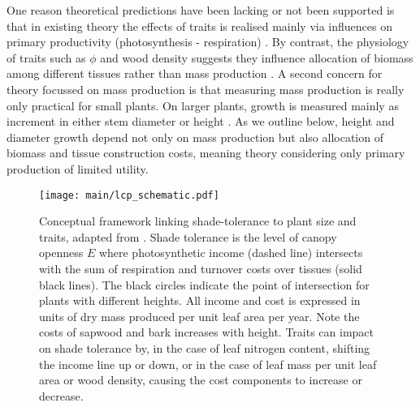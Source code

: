 \documentclass[9pt,twocolumn,twoside,lineno]{pnas-new}
\begin{document}
One reason theoretical predictions have been lacking or not been supported is that in existing theory the effects of traits is realised mainly via influences on primary productivity (photosynthesis - respiration) \citep{Wright-2000, Enquist-2007}. By contrast, the physiology of traits such as $\phi$ and wood density suggests they influence allocation of biomass among different tissues rather than mass production \citep{Falster-2011, Duursma-2016, Gibert-2016}. A second concern for theory focussed on mass production is that measuring mass production is really only practical for small plants. On larger plants, growth is measured mainly as increment in either stem diameter or height \citep{Purves-2008, Anderson-2015, Kunstler-2016}. As we outline below, height and diameter growth depend not only on mass production but also allocation of biomass and tissue construction costs, meaning theory considering only primary production of limited utility.

\begin{figure}[!ht]
\centering
\texttt{[image: main/lcp\_schematic.pdf]}
\caption{Conceptual framework linking shade-tolerance to plant size and traits, adapted from \citep{Givnish-1988}. Shade tolerance is the level of canopy openness $E$ where photosynthetic income (dashed line) intersects with the sum of respiration and turnover costs over tissues (solid black lines). The black circles indicate the point of intersection for plants with different heights. All income and cost is expressed in units of dry mass produced  per unit leaf area per year. Note the costs of sapwood and bark increases with height.
Traits can impact on shade tolerance by, in the case of leaf nitrogen content, shifting the income line up or down, or in the case of leaf mass per unit leaf area or wood density, causing the cost components to increase or decrease.
\label{fig:wplcp_idea}}
\end{figure}
\end{document}
